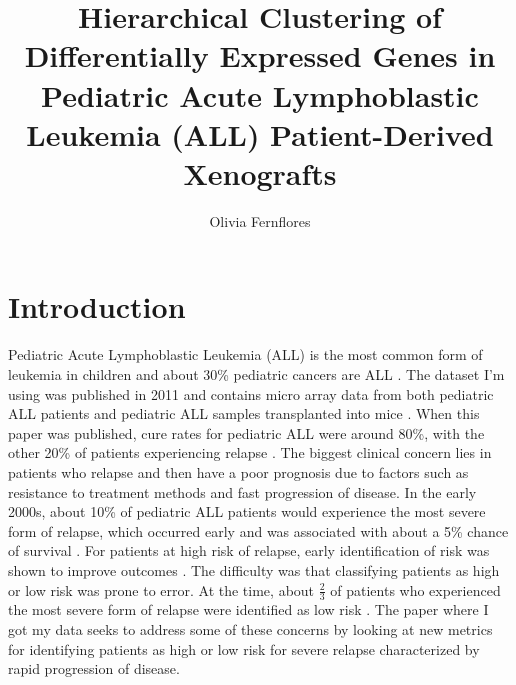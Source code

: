 \documentclass{article}
\title{Hierarchical Clustering of Differentially Expressed Genes in Pediatric Acute Lymphoblastic Leukemia (ALL) Patient-Derived Xenografts}
\author{Olivia Fernflores}
\begin{document}
\maketitle

\section{Introduction}
Pediatric Acute Lymphoblastic Leukemia (ALL) is the most common form of leukemia in children and about 30\% pediatric cancers are ALL \cite{ALL}. The dataset I'm using was published in 2011 and contains micro array data from both pediatric ALL patients and pediatric ALL samples transplanted into mice \cite{data}. When this paper was published, cure rates for pediatric ALL were around 80\%, with the other 20\% of patients experiencing relapse \cite{data}. The biggest clinical concern lies in patients who relapse and then have a poor prognosis due to factors such as resistance to treatment methods and fast progression of disease. In the early 2000s, about 10\% of pediatric ALL patients would experience the most severe form of relapse, which occurred early and was associated with about a 5\% chance of survival \cite{data}. For patients at high risk of relapse, early identification of risk was shown to improve outcomes \cite{data}. The difficulty was that classifying patients as high or low risk was prone to error. At the time, about \(\frac{2}{3}\) of patients who experienced the most severe form of relapse were identified as low risk \cite{data}. The paper where I got my data seeks to address some of these concerns by looking at new metrics for identifying patients as high or low risk for severe relapse characterized by rapid progression of disease. 
\\
\end{document}
